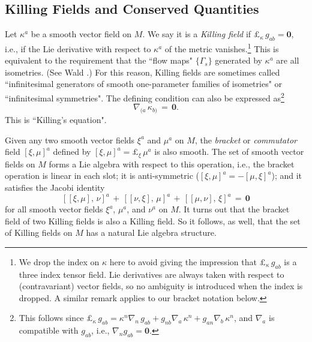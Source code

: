 \documentclass [12] {article}
\theoremstyle{plain}
\numberwithin{figure}{subsection}
\numberwithin{proposition}{subsection}
\begin{document}
\subsection{Killing Fields and Conserved Quantities}

Let $\kappa^a$ be a smooth vector field on $M$. We say it is a \emph{Killing field} if $\pounds_{\kappa} \, g_{ab} = \textbf{0}$, i.e., if the Lie derivative with respect to $\kappa^a$ of the metric vanishes.\footnote{We drop the index on $\kappa$ here to avoid giving the impression that $\pounds_{\kappa} \, g_{ab} $ is a three index tensor field. Lie derivatives are always taken with respect to (contravariant) vector fields, so no ambiguity is introduced when the index is dropped.  A similar remark applies to our bracket notation below.}  This is equivalent to the  requirement that the ``flow maps" $\{\Gamma_s\}$ generated by $\kappa^a$ are all isometries. (See Wald .)  For this reason,  Killing fields are sometimes called ``infinitesimal generators of smooth one-parameter families of  isometries" or ``infinitesimal symmetries".   The defining condition can also be expressed as\footnote{This follows since $\pounds_{\kappa} \, g_{ab} = \kappa^n \nabla_n \,  g_{ab} + g_{nb} \nabla_a \, \kappa^n + g_{an} \nabla_b \, \kappa^n$,  and $\nabla_a$ is compatible with $g_{ab}$, i.e., $\nabla_n g_{ab} = \textbf{0}.$}
%
\begin{equation} \label{Killing's equation}
  \nabla_{(a} \, \kappa_{b)}  \, = \,  \textbf{0}. 
\end{equation}
% 
\noindent  This is ``Killing's equation".

Given any two smooth vector fields $\xi^a$ and $\mu^a$ on $M$, the \emph{bracket} or \emph{commutator} field 
$[\xi ,  \mu]^a$  defined by $[\xi,   \mu]^a  =  \pounds_{\xi} \, \mu^a$  is also smooth.  The set of smooth vector fields on $M$ forms  a Lie algebra with respect to this operation, i.e., the bracket operation is linear in each slot; it is anti-symmetric ($[\xi,   \mu]^a  =  -[\mu,   \xi]^a$); and it satisfies the Jacobi identity
%
\begin{equation} \label{Jacoby identity}
 [[\xi ,  \mu],\, \nu]^a \, + \, [[\nu ,  \xi], \,  \mu]^a \, + \,  [[\mu ,  \nu], \, \xi]^a \, = \, \textbf{0}
\end{equation}
% 
for all smooth vector fields $\xi^a$, $\mu^a$, and $\nu^a$ on $M$. It turns out that the bracket field of two Killing fields is also a Killing field.   So it follows, as well, that the  set of Killing fields on $M$ has a natural Lie algebra structure.    
 
\end{document}
